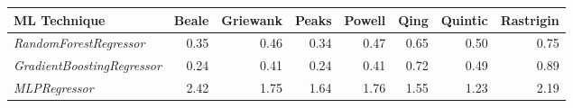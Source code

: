 \begin{table}[ht]
\centering
\begin{tabular}{lrrrrrrr}
  \hline
ML Technique & Beale & Griewank & Peaks & Powell & Qing & Quintic & Rastrigin \\ 
  \hline
{\em RandomForestRegressor} & 0.35 & 0.46 & 0.34 & 0.47 & 0.65 & 0.50 & 0.75 \\ 
  {\em GradientBoostingRegressor} & 0.24 & 0.41 & 0.24 & 0.41 & 0.72 & 0.49 & 0.89 \\ 
  {\em MLPRegressor} & 2.42 & 1.75 & 1.64 & 1.76 & 1.55 & 1.23 & 2.19 \\ 
   \hline
\end{tabular}
\end{table}

